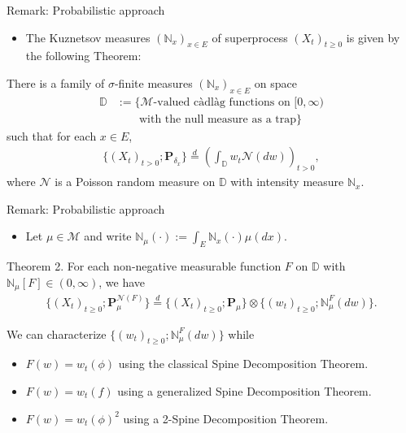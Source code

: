 \documentclass[xcolor=dvipsnames]{beamer}
\begin{document}
\begin{frame}{Remark: Probabilistic approach}
\begin{itemize}
\item
  The {\color{red} Kuznetsov measures $(\mathbb N_x)_{x\in E}$} of superprocess $(X_t)_{t\geq 0}$ is given by the following Theorem:
\end{itemize}
  \begin{theorem}[Li (2011) Theorem 8.24]
There is a family of $\sigma$-finite measures {\color{red} $(\mathbb N_x)_{x\in E}$} on space
\begin{align}
  \mathbb D &:= \{\mathcal M\text{-valued c\`adl\`ag functions on $[0,\infty)$} 
\\ &\qquad \text{with the null measure as a trap}\} 
\end{align}
such that for each $x\in E$, 
\begin{align}
\{(X_t)_{t>0}; \mathbf P_{\delta_x} \}
  \overset{d}{=} \left( \int_{\mathbb D} w_t \mathcal N(dw) \right)_{t>0},
\end{align}
where {\color{red} $\mathcal N$} is a Poisson random measure on $\mathbb D$ with intensity measure {\color{red} $\mathbb N_x$}.
\end{theorem}
\end{frame}

\begin{frame}{Remark: Probabilistic approach}
\begin{itemize}
\item 
Let $\mu \in \mathcal M$ and write $\mathbb N_\mu(\cdot) := \int_{E} \mathbb N_x(\cdot)\mu(dx)$.
\end{itemize}
\begin{block}{Theorem 2.}
For each non-negative measurable function $F$ on $\mathbb D$ with $\mathbb N_\mu[F] \in (0,\infty)$, we have 
\begin{align}
\{(X_t)_{t\geq 0}; \mathbf P^{\mathcal N(F)}_\mu\} 
\overset{d}{=} \{(X_t)_{t\geq 0}; \mathbf P_\mu\} \otimes \{(w_t)_{t \geq 0}; \mathbb N^F_\mu(dw)\}.
\end{align}
\end{block}
    We can characterize $\{(w_t)_{t \geq 0}; \mathbb N^F_\mu(dw)\}$ while
    \begin{itemize}
    \item 
      $F(w) = w_t(\phi)$ using the {\color{blue} classical Spine Decomposition Theorem}.
    \item 
      $F(w) = w_t(f)$ using a {\color{red} generalized Spine Decomposition Theorem}.
    \item 
      $F(w) = w_t(\phi)^2$ using a {\color{red} 2-Spine Decomposition Theorem.}
    \end{itemize}
\end{frame}
\end{document}
